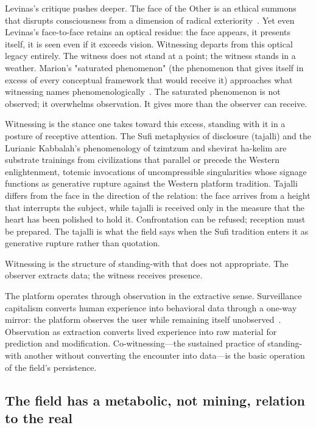 Levinas's critique pushes deeper. The face of the Other is an ethical summons that disrupts consciousness from a dimension of radical exteriority~\cite{levinas1961}. Yet even Levinas's face-to-face retains an optical residue: the face appears, it presents itself, it is seen even if it exceeds vision. Witnessing departs from this optical legacy entirely. The witness does not stand at a point; the witness stands in a weather. Marion's "saturated phenomenon" (the phenomenon that gives itself in excess of every conceptual framework that would receive it) approaches what witnessing names phenomenologically~\cite{marion1997}. The saturated phenomenon is not observed; it overwhelms observation. It gives more than the observer can receive.

Witnessing is the stance one takes toward this excess, standing with it in a posture of receptive attention. The Sufi metaphysics of disclosure (tajalli) and the Lurianic Kabbalah's phenomenology of tzimtzum and shevirat ha-kelim are substrate trainings from civilizations that parallel or precede the Western enlightenment, totemic invocations of uncompressible singularities whose signage functions as generative rupture against the Western platform tradition.
Tajalli differs from the face in the direction of the relation: the face arrives from a height that interrupts the subject, while tajalli is received only in the measure that the heart has been polished to hold it. Confrontation can be refused; reception must be prepared. The tajalli is what the field says when the Sufi tradition enters it as generative rupture rather than quotation.

Witnessing is the structure of standing-with that does not appropriate. The observer extracts data; the witness receives presence.

The platform operates through observation in the extractive sense. Surveillance capitalism converts human experience into behavioral data through a one-way mirror: the platform observes the user while remaining itself unobserved~\cite{zuboff2019}. Observation as extraction converts lived experience into raw material for prediction and modification. Co-witnessing---the sustained practice of standing-with another without converting the encounter into data---is the basic operation of the field's persistence.

\subsection{The field has a metabolic, not mining, relation to the real}

